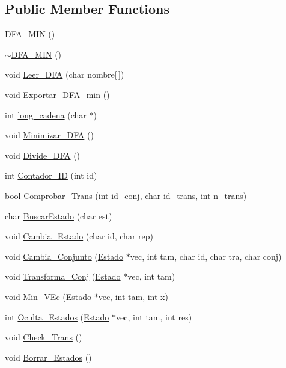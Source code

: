 \subsection*{Public Member Functions}
\begin{DoxyCompactItemize}
\item 
\hyperlink{classDFA__MIN_ab23d007d4a597b9242ec63b175c0d442}{D\+F\+A\+\_\+\+M\+IN} ()
\item 
\hyperlink{classDFA__MIN_abd44cdc58f7ac815124722ab26070c59}{$\sim$\+D\+F\+A\+\_\+\+M\+IN} ()
\item 
void \hyperlink{classDFA__MIN_a933ed65f474a79dd69bd77af2c9ab4fc}{Leer\+\_\+\+D\+FA} (char nombre\mbox{[}$\,$\mbox{]})
\item 
void \hyperlink{classDFA__MIN_a45f3039094bbb7dcd19de0c49419243f}{Exportar\+\_\+\+D\+F\+A\+\_\+min} ()
\item 
int \hyperlink{classDFA__MIN_af199da3ede7ed11204a754c2183aab08}{long\+\_\+cadena} (char $\ast$)
\item 
void \hyperlink{classDFA__MIN_a359c0fec7be50994213ab598c62c69ec}{Minimizar\+\_\+\+D\+FA} ()
\item 
void \hyperlink{classDFA__MIN_a02572f57610c3eaace394c5e487ab524}{Divide\+\_\+\+D\+FA} ()
\item 
int \hyperlink{classDFA__MIN_a63aceba3b4ca0527cde22afdb09c05a4}{Contador\+\_\+\+ID} (int id)
\item 
bool \hyperlink{classDFA__MIN_a23fffd70992a82b8f2f574dd2ddde71e}{Comprobar\+\_\+\+Trans} (int id\+\_\+conj, char id\+\_\+trans, int n\+\_\+trans)
\item 
char \hyperlink{classDFA__MIN_a7d8b26d37ceb44ee9f2da46b849096a1}{Buscar\+Estado} (char est)
\item 
void \hyperlink{classDFA__MIN_aa739fb89570a82ff0af1997e2cf05e8d}{Cambia\+\_\+\+Estado} (char id, char rep)
\item 
void \hyperlink{classDFA__MIN_a3c7227b8f88987417625b25ec0410fe8}{Cambia\+\_\+\+Conjunto} (\hyperlink{classEstado}{Estado} $\ast$vec, int tam, char id, char tra, char conj)
\item 
void \hyperlink{classDFA__MIN_a0facf3c8cea99d1235593bf2b65e0e4e}{Transforma\+\_\+\+Conj} (\hyperlink{classEstado}{Estado} $\ast$vec, int tam)
\item 
void \hyperlink{classDFA__MIN_a9d98e8fe7dbd789624ed083484a5c04a}{Min\+\_\+\+V\+Ec} (\hyperlink{classEstado}{Estado} $\ast$vec, int tam, int x)
\item 
int \hyperlink{classDFA__MIN_ad025e5ebeb4dcca68a1e27d0f91d0b27}{Oculta\+\_\+\+Estados} (\hyperlink{classEstado}{Estado} $\ast$vec, int tam, int res)
\item 
void \hyperlink{classDFA__MIN_acbb53157090bbfa6fee78eadab964082}{Check\+\_\+\+Trans} ()
\item 
void \hyperlink{classDFA__MIN_af3f05b252ab137139773054ba0596130}{Borrar\+\_\+\+Estados} ()
\end{DoxyCompactItemize}
